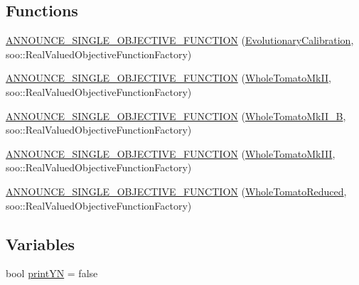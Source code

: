 \subsection*{\-Functions}
\begin{DoxyCompactItemize}
\item 
\hyperlink{namespace_p_r_p_s_evolution_1_1_models_ab54e99459ea0a809ce4b608f4efd59c7}{\-A\-N\-N\-O\-U\-N\-C\-E\-\_\-\-S\-I\-N\-G\-L\-E\-\_\-\-O\-B\-J\-E\-C\-T\-I\-V\-E\-\_\-\-F\-U\-N\-C\-T\-I\-O\-N} (\hyperlink{struct_p_r_p_s_evolution_1_1_models_1_1_evolutionary_calibration}{\-Evolutionary\-Calibration}, soo\-::\-Real\-Valued\-Objective\-Function\-Factory)
\item 
\hyperlink{namespace_p_r_p_s_evolution_1_1_models_a5b074eca448f48ce8fe783ee12d94b7b}{\-A\-N\-N\-O\-U\-N\-C\-E\-\_\-\-S\-I\-N\-G\-L\-E\-\_\-\-O\-B\-J\-E\-C\-T\-I\-V\-E\-\_\-\-F\-U\-N\-C\-T\-I\-O\-N} (\hyperlink{struct_p_r_p_s_evolution_1_1_models_1_1_whole_tomato_mk_i_i}{\-Whole\-Tomato\-Mk\-I\-I}, soo\-::\-Real\-Valued\-Objective\-Function\-Factory)
\item 
\hyperlink{namespace_p_r_p_s_evolution_1_1_models_aca9f5baab19c8a5ed727613696669b9e}{\-A\-N\-N\-O\-U\-N\-C\-E\-\_\-\-S\-I\-N\-G\-L\-E\-\_\-\-O\-B\-J\-E\-C\-T\-I\-V\-E\-\_\-\-F\-U\-N\-C\-T\-I\-O\-N} (\hyperlink{struct_p_r_p_s_evolution_1_1_models_1_1_whole_tomato_mk_i_i___b}{\-Whole\-Tomato\-Mk\-I\-I\-\_\-\-B}, soo\-::\-Real\-Valued\-Objective\-Function\-Factory)
\item 
\hyperlink{namespace_p_r_p_s_evolution_1_1_models_a518c9d18a4a1c9da210018fa1a08393e}{\-A\-N\-N\-O\-U\-N\-C\-E\-\_\-\-S\-I\-N\-G\-L\-E\-\_\-\-O\-B\-J\-E\-C\-T\-I\-V\-E\-\_\-\-F\-U\-N\-C\-T\-I\-O\-N} (\hyperlink{struct_p_r_p_s_evolution_1_1_models_1_1_whole_tomato_mk_i_i_i}{\-Whole\-Tomato\-Mk\-I\-I\-I}, soo\-::\-Real\-Valued\-Objective\-Function\-Factory)
\item 
\hyperlink{namespace_p_r_p_s_evolution_1_1_models_a01008e413c2375cf5d0d23aefb33c57a}{\-A\-N\-N\-O\-U\-N\-C\-E\-\_\-\-S\-I\-N\-G\-L\-E\-\_\-\-O\-B\-J\-E\-C\-T\-I\-V\-E\-\_\-\-F\-U\-N\-C\-T\-I\-O\-N} (\hyperlink{struct_p_r_p_s_evolution_1_1_models_1_1_whole_tomato_reduced}{\-Whole\-Tomato\-Reduced}, soo\-::\-Real\-Valued\-Objective\-Function\-Factory)
\end{DoxyCompactItemize}
\subsection*{\-Variables}
\begin{DoxyCompactItemize}
\item 
bool \hyperlink{namespace_p_r_p_s_evolution_1_1_models_a7ae6e9265cb743cb598d4b631ba23c0a}{print\-Y\-N} = false
\end{DoxyCompactItemize}


